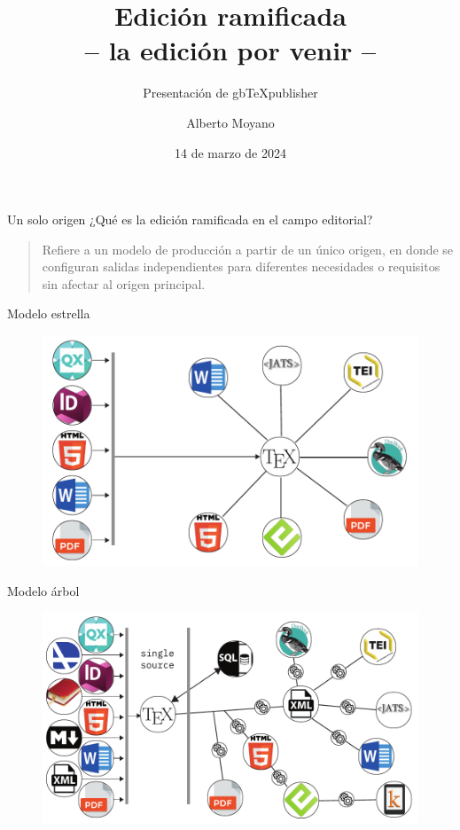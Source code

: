 \documentclass[14pt,aspectratio=169]{beamer}
\title{Edición ramificada\\ -- la edición por venir --}
\subtitle{Presentación de gbTeXpublisher}
\author{Alberto Moyano}
\date{14 de marzo de 2024}
\institute{\url{https://gitlab.com/alberto.alejandro.moyano/CHARLAUBA}}
\begin{document}
	\begin{frame}
		\titlepage
	\end{frame}

\begin{frame}{Un solo origen}
	¿Qué es la edición ramificada en el campo editorial?\vspace{14pt}

	\begin{quote}
	Refiere a un modelo de producción a partir de un único origen, en donde se configuran salidas independientes para diferentes necesidades o requisitos sin afectar al origen principal.
	\end{quote}
\end{frame}

\begin{frame}{Modelo estrella}
	\begin{figure}
		\centering
		\includegraphics[width=.7\textwidth]{estrella.pdf}
	\end{figure}
\end{frame}

\begin{frame}{Modelo árbol}
	\begin{figure}
		\centering
		\includegraphics[width=.8\textwidth]{arbol.pdf}
	\end{figure}
\end{frame}
\end{document}
